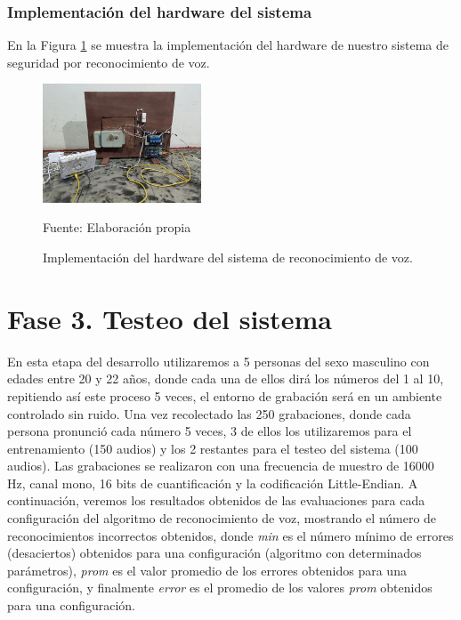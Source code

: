 \subsubsection{Implementación del hardware del sistema}
En la Figura \ref{fig:figura3.70} se muestra la implementación del hardware de nuestro sistema de seguridad por reconocimiento de voz.
\begin{figure}[H]
\captionsetup{justification=centering}
\begin{center}
\includegraphics[width=0.42\textwidth]{Imagenes/Cap3/image070}
\end{center}
\begin{center}
\vskip -0.5cm
\caption{\small{Implementación del hardware del sistema de reconocimiento de voz.}}
\label{fig:figura3.70}
{\small{Fuente: Elaboración propia}}
\end{center}
\end{figure}
\vskip -0.5cm
\newpage
\section{Fase 3. Testeo del sistema}
En esta etapa del desarrollo utilizaremos a 5 personas del sexo masculino con edades entre 20 y 22 años, donde cada una de ellos dirá los números del 1 al 10, repitiendo así este proceso 5 veces, el entorno de grabación será en un ambiente controlado sin ruido.
\vskip 0.5cm
Una vez recolectado las 250 grabaciones, donde cada persona pronunció cada número 5 veces, 3 de ellos los utilizaremos para el entrenamiento (150 audios) y los 2 restantes para el testeo del sistema (100 audios). Las grabaciones se realizaron con una frecuencia de muestro de 16000 Hz, canal mono, 16 bits de cuantificación y la codificación Little-Endian.
\vskip 0.5cm
A continuación, veremos los resultados obtenidos de las evaluaciones para cada configuración del algoritmo de reconocimiento de voz, mostrando el número de reconocimientos incorrectos obtenidos, donde \textit{min} es el número mínimo de errores (desaciertos) obtenidos para una configuración (algoritmo con determinados parámetros), \textit{prom} es el valor promedio de los errores obtenidos para una configuración, y finalmente \textit{error} es el promedio de los valores \textit{prom} obtenidos para una configuración.

